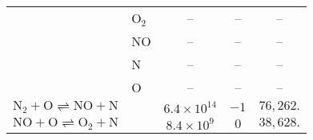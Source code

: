 \begin{table}[hbtp]
\begin{center}
\begin{tabular}{|l|l|ccc|}
                                                                                  & O$_2$ & -- & --  & -- \\
                                                                                  & NO    & -- & --  & -- \\
                                                                                  & N     & -- & --  & -- \\
                                                                                  & O     & -- & --  & -- \\ \hline
  $\text{N}_2 + \text{O}    \rightleftharpoons \text{NO} + \text{N}$  &  & $6.4\times 10^{14}$ & $-1$ & $76,262.$ \\  \hline
  $\text{NO} + \text{O}     \rightleftharpoons \text{O}_2 + \text{N}$ &  & $8.4\times 10^{9}$  & $0$  & $38,628.$ \\ \hline  
   \end{tabular}
  \end{center}
\end{table}

